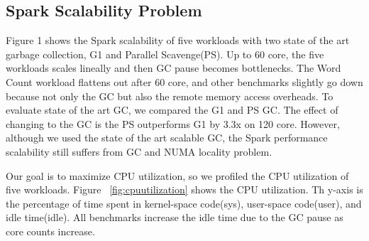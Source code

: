 \fi


\subsection{Spark Scalability Problem}
Figure 1 shows the Spark scalability of five workloads with two state of the art garbage
collection, G1 and Parallel Scavenge(PS).
Up to 60 core, the five workloads scales lineally and then GC pause becomes bottlenecks.
The Word Count workload flattens out after 60 core, and other benchmarks slightly go
down because not only the GC but also the remote memory access overheads. 
To evaluate state of the art GC, we compared the G1 and PS GC.
The effect of changing to the GC is the PS outperforms G1 by 3.3x on 120 core.
However, although we used the state of the art scalable GC,
the Spark performance scalability still suffers from GC and NUMA locality problem.


Our goal is to maximize CPU utilization, so we profiled the CPU utilization of five workloads.
Figure ~\ref{fig:cpuutilization} shows the CPU utilization.
Th y-axis is the percentage of time spent in kernel-space code(sys), user-space
code(user), and idle time(idle).
All benchmarks increase the idle time due to the GC pause as core counts increase.

\ifkor
\else


